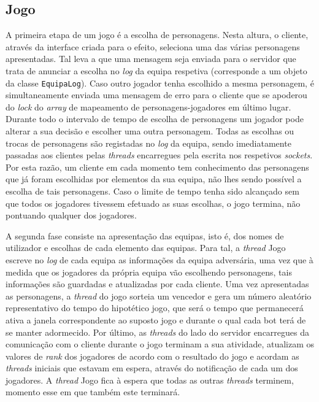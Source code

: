 \documentclass{llncs}
\begin{document}
\subsection{Jogo} \label{Jogo}

A primeira etapa de um jogo é a escolha de personagens. Nesta altura, o 
cliente, através da interface criada para o efeito, seleciona uma das 
várias personagens apresentadas. Tal leva a que uma mensagem seja enviada 
para o servidor que trata de anunciar a escolha no \textit{log} da equipa respetiva 
(corresponde a um objeto da classe \texttt{EquipaLog}). Caso outro jogador 
tenha escolhido a mesma personagem, é simultaneamente enviada uma mensagem 
de erro para o cliente que se apoderou do \textit{lock} do \textit{array} 
de mapeamento de personagens-jogadores em último lugar. Durante todo 
o intervalo de tempo de escolha de personagens um jogador pode alterar a 
sua decisão e escolher uma outra personagem. Todas as escolhas ou trocas 
de personagens são registadas no \textit{log} da equipa, sendo imediatamente 
passadas aos clientes pelas \textit{threads} encarregues pela escrita nos 
respetivos \textit{sockets}. Por esta razão, um cliente em cada momento tem 
conhecimento das personagens que já foram escolhidas por elementos da sua 
equipa, não lhes sendo possível a escolha de tais personagens. Caso o 
limite de tempo tenha sido alcançado sem que todos os jogadores tivessem efetuado 
as suas escolhas, o jogo termina, não pontuando qualquer dos jogadores. 

A segunda fase consiste na apresentação das equipas, isto é, dos nomes de 
utilizador e escolhas de cada elemento das equipas. Para tal, a \textit{thread} 
Jogo escreve no \textit{log} de cada equipa as informações da equipa adversária, 
uma vez que à medida que os jogadores da própria equipa vão escolhendo personagens, 
tais informações são guardadas e atualizadas por cada cliente. Uma vez apresentadas 
as personagens, a \textit{thread} do jogo sorteia um vencedor e gera um número 
aleatório representativo do tempo do hipotético jogo, que será o tempo que permanecerá 
ativa a janela correspondente ao suposto jogo e durante o qual cada bot terá de se 
manter adormecido. Por último, as \textit{threads} do lado do servidor encarregues 
da comunicação com o cliente durante o jogo terminam a sua atividade, atualizam os 
valores de \textit{rank} dos jogadores de acordo com o resultado do jogo e acordam 
as \textit{threads} iniciais que estavam em espera, através do notificação de cada um 
dos jogadores. A \textit{thread} Jogo fica à espera que todas as outras 
\textit{threads} terminem, momento esse em que também este terminará. 
\end{document}
